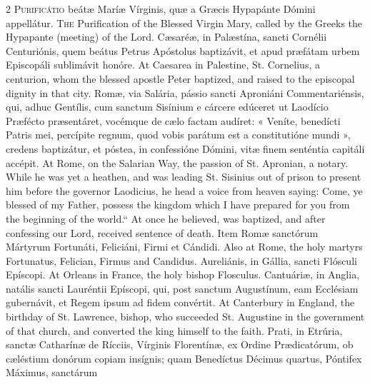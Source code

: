 \begin{paracol}{2}
\lettrine[lines=2]{P}{urificátio} beátæ Maríæ Vírginis, quæ a Græcis 
 Hypapánte Dómini appellátur.
\switchcolumn
{}
\lettrine[lines=2]{T}{he} Purification of the Blessed Virgin Mary, called by the Greeks the 
 Hypapante (meeting) of the Lord.
\switchcolumn*
{}
Cæsaréæ, in Palæstína, sancti Cornélii 
 Centuriónis, quem beátus Petrus Apóstolus baptizávit, et apud præfátam urbem 
 Episcopáli sublimávit honóre.
\switchcolumn
{}
At Caesarea in Palestine, St. Cornelius, a centurion, whom the blessed 
 apostle Peter baptized, and raised to the episcopal dignity in that city.
\switchcolumn*
{}
Romæ, via Salária, pássio sancti Aproniáni 
 Commentariénsis, qui, adhuc Gentílis, cum sanctum Sisínium e cárcere 
 edúceret ut Laodício Præfécto præsentáret, vocémque de cælo factam audíret: 
 « Veníte, benedícti Patris mei, percípite regnum, quod vobis parátum est a 
 constitutióne mundi », credens baptizátur, et póstea, in confessióne Dómini, 
 vitæ finem senténtia capitáli accépit.
\switchcolumn
{}
At Rome, on the Salarian Way, the passion of St. Apronian, a notary. 
 While he was yet a heathen, and was leading St. Sisinius out of prison to 
 present him before the governor Laodicius, he head a voice from heaven 
 saying: Come, ye blessed of my Father, possess the kingdom which I have 
 prepared for you from the beginning of the world.`` At once he 
 believed, was baptized, and after confessing our Lord, received sentence of 
 death.
\switchcolumn*
{}
Item Romæ sanctórum Mártyrum Fortunáti, 
 Feliciáni, Firmi et Cándidi.
\switchcolumn
{}
Also at Rome, the holy martyrs Fortunatus, Felician, Firmus and Candidus.
\switchcolumn*
{}
Aureliánis, in Gállia, sancti Flósculi Epíscopi.
\switchcolumn
{}
At Orleans in France, the holy bishop Flosculus.
\switchcolumn*
{}
Cantuáriæ, in Anglia, natális sancti Lauréntii 
 Epíscopi, qui, post sanctum Augustínum, eam Ecclésiam gubernávit, et Regem 
 ipsum ad fidem convértit.
\switchcolumn
{}
At Canterbury in England, the birthday of St. Lawrence, bishop, who 
 succeeded St. Augustine in the government of that church, and converted the 
 king himself to the faith.
\switchcolumn*
{}
Prati, in Etrúria, sanctæ Catharínæ de Rícciis, 
 Vírginis Florentínæ, ex Ordine Prædicatórum, ob cæléstium donórum copiam 
 insígnis; quam Benedíctus Décimus quartus, Póntifex Máximus, sanctárum 

\end{paracol}
